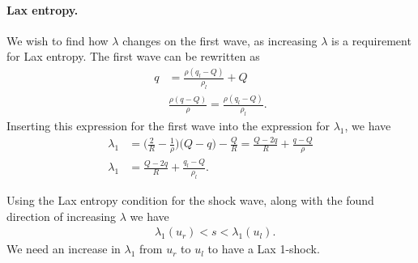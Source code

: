 \documentclass[10pt]{article}
\numberwithin{equation}{section}
\begin{document}
\paragraph{Lax entropy.}
We wish to find how $\lambda$ changes on the first wave, as increasing $\lambda$ is a requirement for Lax entropy. The first wave can be rewritten as 
\begin{align*}
q &=  \frac{\rho( q_l - Q)}{\rho_l} + Q \\
 & \frac{\rho( q - Q)}{\rho}  =  \frac{\rho( q_l - Q)}{\rho_l}.
\end{align*}
Inserting this expression for the first wave into the expression for $\lambda_1$, we have
\begin{align}
     \lambda_1 &= \big ( \frac{2}{R} - \frac{1}{\rho} )\big (Q- q) - \frac{Q}{R} 
     = \frac{Q - 2q}{R} + \frac{q-Q}{\rho} \nonumber \\
     \lambda_1 &= \frac{Q - 2q}{R} + \frac{q_l-Q}{\rho_l}.
     \label{Eq:DirectionOfLambda}
\end{align}

Using the Lax entropy condition for the shock wave, along with the found direction of increasing $\lambda$ we have \begin{align}
   &  \lambda_1 (u_r) < s < \lambda_1 (u_l).
   \label{Eq:LaxEntropyCongPh}
\end{align} We need an increase in $\lambda_1 $ from $u_r$ to $u_l$ to have a Lax 1-shock.

\begin{figure}
    \centering
    
\end{figure}
\end{document}
